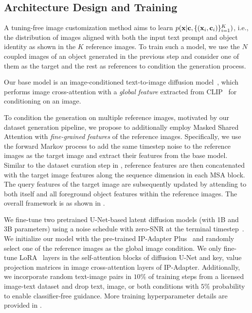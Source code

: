 \subsection{Architecture Design and Training}

A tuning-free image customization method aims to learn $p({\mathbf{x}} | {\mathbf{c}}, \{({\mathbf{x}}_i, {\mathbf{c}}_i)\}_{i=1}^K)$, i.e., the distribution of images aligned with both the input text prompt and object identity as shown in the $K$ reference images. To train such a model, we use the $N$ coupled images of an object generated in the previous step and consider one of them as the target and the rest as references to condition the generation process.  %

 Our base model is an image-conditioned text-to-image diffusion model~\cite{ye2023ip}, which performs image cross-attention with a \emph{global feature} extracted from CLIP~\cite{radford2021learning} for conditioning on an image.

To condition the generation on multiple reference images, motivated by our dataset generation pipeline, we propose to additionally employ Masked Shared Attention with \emph{fine-grained features} of the reference images. Specifically, we use the forward Markov process to add the same timestep noise to the reference images as the target image and extract their features from the base model. Similar to the dataset curation step in , 
reference features are then concatenated with the target image features along the sequence dimension in each MSA block. The query features of the target image are subsequently updated by attending to both itself and all foreground object features within the reference images. The overall framework is as shown in .




We fine-tune two pretrained U-Net-based latent diffusion models (with 1B and 3B parameters) using a noise schedule with zero-SNR at the terminal timestep~\cite{lin2024common}. 
We initialize our model with the pre-trained IP-Adapter Plus~\cite{ye2023ip} and randomly select one of the reference images as the global image condition. We only fine-tune LoRA~\cite{hu2021lora} layers in the self-attention blocks of diffusion U-Net and key, value projection matrices in image cross-attention layers of IP-Adapter. Additionally, we incorporate random text-image pairs in $10\%$ of training steps from a licensed image-text dataset and drop text, image, or both conditions with $5\%$ probability to enable classifier-free guidance. More training hyperparameter details are provided in .



